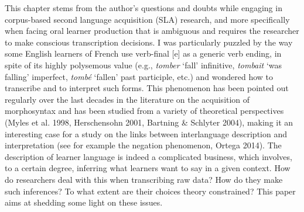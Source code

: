\documentclass[11pt]{article}
\newenvironment{styleStandard}{\renewcommand\baselinestretch{1.0}\setlength\leftskip{0cm}\setlength\rightskip{0cm plus 1fil}\setlength\parindent{0cm}\setlength\parfillskip{0pt plus 1fil}\setlength\parskip{0in plus 1pt}\writerlistparindent\writerlistleftskip\leavevmode\normalfont\normalsize\writerlistlabel\ignorespaces}{\unskip\vspace{0.111in plus 0.0111in}\par}
\newcommand\writerlistleftskip{}
\newcommand\writerlistparindent{}
\newcommand\writerlistlabel{}
\begin{document}
\begin{styleStandard}
This chapter stems from the author’s questions and doubts while engaging in corpus-based second language acquisition (SLA) research, and more specifically when facing oral learner production that is ambiguous and requires the researcher to make conscious transcription decisions. I was particularly puzzled by the way some English learners of French use verb-final [e] as a generic verb ending, in spite of its highly polysemous value (e.g., \textit{tomber} ‘fall’ infinitive, \textit{tombait} ‘was falling’ imperfect, \textit{tombé} ‘fallen’ past participle, etc.) and wondered how to transcribe and to interpret such forms. This phenomenon has been pointed out regularly over the last decades in the literature on the acquisition of morphosyntax and has been studied from a variety of theoretical perspectives (Myles et al. 1998, Herschensohn 2001, Bartning \& Schlyter 2004), making it an interesting case for a study on the links between interlanguage description and interpretation (see for example the negation phenomenon, Ortega 2014). The description of learner language is indeed a complicated business, which involves, to a certain degree, inferring what learners want to say in a given context. How do researchers deal with this when transcribing raw data? How do they make such inferences? To what extent are their choices theory constrained? This paper aims at shedding some light on these issues.
\end{styleStandard}
\end{document}
